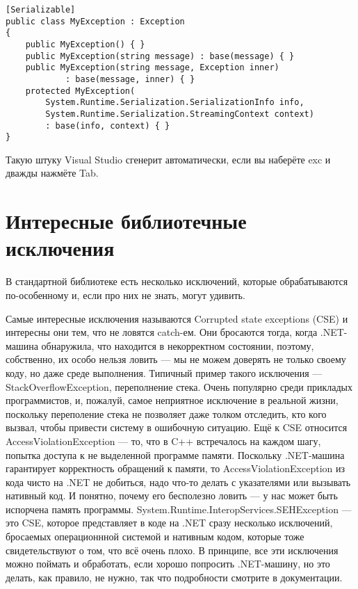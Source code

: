 \documentclass[a5paper]{article}
\begin{document}
\begin{verbatim}
[Serializable]
public class MyException : Exception
{
    public MyException() { }
    public MyException(string message) : base(message) { }
    public MyException(string message, Exception inner) 
            : base(message, inner) { }
    protected MyException(
        System.Runtime.Serialization.SerializationInfo info,
        System.Runtime.Serialization.StreamingContext context)
        : base(info, context) { }
}
\end{verbatim}

Такую штуку Visual Studio сгенерит автоматически, если вы наберёте exc и дважды нажмёте Tab.

\section{Интересные библиотечные исключения}

В стандартной библиотеке есть несколько исключений, которые обрабатываются по-особенному и, если про них не знать, могут удивить. 

Самые интересные исключения называются Corrupted state exceptions (CSE) и интересны они тем, что не ловятся catch-ем. Они бросаются тогда, когда .NET-машина обнаружила, что находится в некорректном состоянии, поэтому, собственно, их особо нельзя ловить --- мы не можем доверять не только своему коду, но даже среде выполнения. Типичный пример такого исключения --- StackOverflowException, переполнение стека. Очень популярно среди прикладых программистов, и, пожалуй, самое неприятное исключение в реальной жизни, поскольку переполение стека не позволяет даже толком отследить, кто кого вызвал, чтобы привести систему в ошибочную ситуацию. Ещё к CSE относится AccessViolationException --- то, что в C++ встречалось на каждом шагу, попытка доступа к не выделенной программе памяти. Поскольку .NET-машина гарантирует корректность обращений к памяти, то AccessViolationException из кода чисто на .NET не добиться, надо что-то делать с указателями или вызывать нативный код. И понятно, почему его бесполезно ловить --- у нас может быть испорчена память программы. System.Runtime.InteropServices.SEHException --- это CSE, которое представляет в коде на .NET сразу несколько исключений, бросаемых операционнной системой и нативным кодом, которые тоже свидетельствуют о том, что всё очень плохо. В принципе, все эти исключения можно поймать и обработать, если хорошо попросить .NET-машину, но это делать, как правило, не нужно, так что подробности смотрите в документации.
\end{document}
